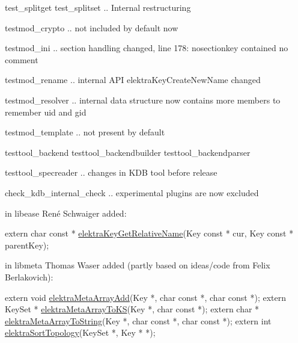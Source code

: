\begin{DoxyItemize}
\item test\+\_\+splitget test\+\_\+splitset .. Internal restructuring
\item testmod\+\_\+crypto .. not included by default now
\item testmod\+\_\+ini .. section handling changed, line 178\+: {\ttfamily nosectionkey contained no comment}
\item testmod\+\_\+rename .. internal A\+PI elektra\+Key\+Create\+New\+Name changed
\item testmod\+\_\+resolver .. internal data structure now contains more members to remember uid and gid
\item testmod\+\_\+template .. not present by default
\item testtool\+\_\+backend testtool\+\_\+backendbuilder testtool\+\_\+backendparser
\item testtool\+\_\+specreader .. changes in K\+DB tool before release
\item check\+\_\+kdb\+\_\+internal\+\_\+check .. experimental plugins are now excluded
\end{DoxyItemize}

in libease René Schwaiger added\+:


\begin{DoxyCode}
\textcolor{keyword}{extern} \textcolor{keywordtype}{char} \textcolor{keyword}{const} * \hyperlink{ease_2keyname_8c_a7a8eff2d0ef19a64a9beeedfcfe1df22}{elektraKeyGetRelativeName}(Key \textcolor{keyword}{const} * cur, Key \textcolor{keyword}{const} * 
      parentKey);
\end{DoxyCode}


in libmeta Thomas Waser added (partly based on ideas/code from Felix Berlakovich)\+:


\begin{DoxyCode}
\textcolor{keyword}{extern} \textcolor{keywordtype}{void} \hyperlink{group__meta_ga166c65c4eb2d758ced57b0bd74fb9a57}{elektraMetaArrayAdd}(Key *, \textcolor{keywordtype}{char} \textcolor{keyword}{const} *, \textcolor{keywordtype}{char} \textcolor{keyword}{const} *);
\textcolor{keyword}{extern} KeySet * \hyperlink{group__meta_ga57e189e739d942d60bb83765ced5cef2}{elektraMetaArrayToKS}(Key *, \textcolor{keywordtype}{char} \textcolor{keyword}{const} *);
\textcolor{keyword}{extern} \textcolor{keywordtype}{char} * \hyperlink{group__meta_ga40469799e2c6e9937eaf013bfc05d014}{elektraMetaArrayToString}(Key *, \textcolor{keywordtype}{char} \textcolor{keyword}{const} *, \textcolor{keywordtype}{char} \textcolor{keyword}{const} *);
\textcolor{keyword}{extern} \textcolor{keywordtype}{int} \hyperlink{group__meta_gaadfae80314be2415a7654fe8a0d2ee82}{elektraSortTopology}(KeySet *, Key * *);
\end{DoxyCode}


